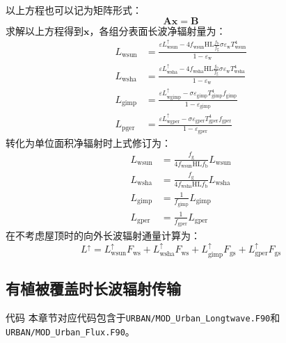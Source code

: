 以上方程也可以记为矩阵形式：
\begin{equation}
  \mathbf{A x}=\mathbf{B}
\end{equation}
求解以上方程得到$\mathbf{x}$，各组分表面长波净辐射量为：
\begin{equation}\label{L_wsun_wsha_gimp_pger_1}
  \begin{aligned}
    L_{\mathrm{wsun}} &=\frac{\varepsilon L_{\mathrm{wsun}}^{\uparrow}-4 f_{\mathrm{wsun}} \mathrm{HL} \frac{f_{\mathrm{b}}}{f_{\mathrm{g}}} \sigma \varepsilon_{\mathrm{w}} T_{\mathrm{wsun}}^{4}}{1-\varepsilon_{\mathrm{w}}} \\ L_{\mathrm{wsha}} &=\frac{\varepsilon L_{\mathrm{wsha}}^{\uparrow}-4 f_{\mathrm{wsha}} \mathrm{HL} \frac{f_{\mathrm{b}}}{f_{\mathrm{g}}} \sigma \varepsilon_{\mathrm{w}} T_{\mathrm{wsha}}^{4}}{1-\varepsilon_{\mathrm{w}}} \\ L_{\mathrm{gimp}} &=\frac{\varepsilon L_{\mathrm{w gimp}}^{\uparrow}-\sigma \varepsilon_{\mathrm{gimp}} T_{\mathrm{gimp}}^{4} f_{\mathrm{gimp}}}{1-\varepsilon_{\mathrm{gimp}}} \\ L_{\mathrm{p g e r}} &=\frac{\varepsilon L_{\mathrm{w gper}}^{\uparrow}-\sigma \varepsilon_{\mathrm{gper}} T_{\mathrm{gper}}^{4} f_{\mathrm{gper}}}{1-\varepsilon_{\mathrm{gper}}}
  \end{aligned}
\end{equation}
转化为单位面积净辐射时上式修订为：
\begin{equation}\label{L_wsun_wsha_gimp_pger_2}
  \begin{aligned}
    L_{\mathrm{wsun}} &=\frac{f_{\mathrm{g}}}{4 f_{\mathrm{wsun}} \mathrm{HL} f_{\mathrm{b}}} L_{\mathrm{wsun}} \\ L_{\mathrm{wsha}} &=\frac{f_{\mathrm{g}}}{4 f_{\mathrm{wsha}} \mathrm{HL} f_{\mathrm{b}}} L_{\mathrm{wsha}} \\ L_{\mathrm{gimp}} &=\frac{1}{f_{\mathrm{gimp}}} L_{\mathrm{gimp}} \\ L_{\mathrm{gper}} &=\frac{1}{f_{\mathrm{gper}}} L_{\mathrm{gper}}
  \end{aligned}
\end{equation}
在不考虑屋顶时的向外长波辐射通量计算为：
\begin{equation}
  L^{\uparrow}=L_{\mathrm{wsun}}^{\uparrow} F_{\mathrm{ws}}+L_{\mathrm{wsha}}^{\uparrow} F_{\mathrm{ws}}+L_{\mathrm{gimp}}^{\uparrow} F_{\mathrm{gs}}+L_{\mathrm{gper}}^{\uparrow} F_{\mathrm{gs}}
\end{equation}


\subsection{有植被覆盖时长波辐射传输}\label{有植被覆盖时长波辐射传输}
\begin{mymdframed}{代码}
  本章节对应代码包含于\texttt{URBAN/MOD\_Urban\_Longtwave.F90}和\texttt{URBAN/MOD\_Urban\_\allowbreak Flux.F90}。
\end{mymdframed}

